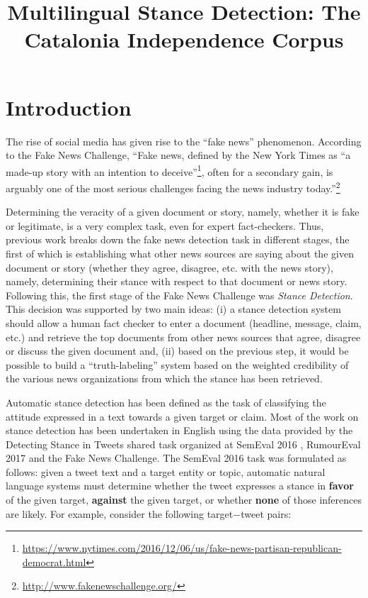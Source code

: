 \documentclass[10pt, a4paper]{article}
\title{Multilingual Stance Detection: The Catalonia Independence Corpus}
\begin{document}
\maketitleabstract

\section{Introduction}

The rise of social media has given rise to the ``fake news'' phenomenon. According to the Fake News Challenge, ``Fake news, defined by the New York Times as ``a made-up story with an intention to deceive''\footnote{\url{https://www.nytimes.com/2016/12/06/us/fake-news-partisan-republican-democrat.html}}, often for a secondary gain, is arguably one of the most serious challenges facing the news industry today.''\footnote{\url{http://www.fakenewschallenge.org/}}

Determining the veracity of a given document or story, namely, whether it is fake or legitimate, is a very complex task, even for expert fact-checkers. Thus, previous work breaks down the fake news detection task in different stages, the first of which is establishing what other news sources are saying about the given document or story (whether they agree, disagree, etc. with the news story), namely, determining their stance with respect to that document or news story. Following this, the first stage of the Fake News Challenge was \emph{Stance Detection}. This decision was supported by two main ideas: (i) a stance detection system should allow a human fact checker to enter a document (headline, message, claim, etc.) and retrieve the top documents from other news sources that agree, disagree or discuss the given document and, (ii) based on the previous step, it would be possible to build a ``truth-labeling'' system based on the weighted credibility of the various news organizations from which the stance has been retrieved.

Automatic stance detection has been defined as the task of classifying the attitude expressed in a text towards a given target or claim. Most of the work on stance detection has been undertaken in English using the data provided by the Detecting Stance in Tweets shared task organized at SemEval 2016 \cite{mohammad-etal-2016-semeval}, RumourEval 2017 \cite{derczynski-etal-2017-semeval} and the Fake News Challenge. The SemEval 2016 task was formulated as follows: given a tweet text and a target entity or topic, automatic natural language systems must determine whether the tweet expresses a stance in \textbf{favor} of the given target, \textbf{against} the given target, or whether \textbf{none} of those inferences are likely. For example, consider the following target$-$tweet pairs:
\end{document}
